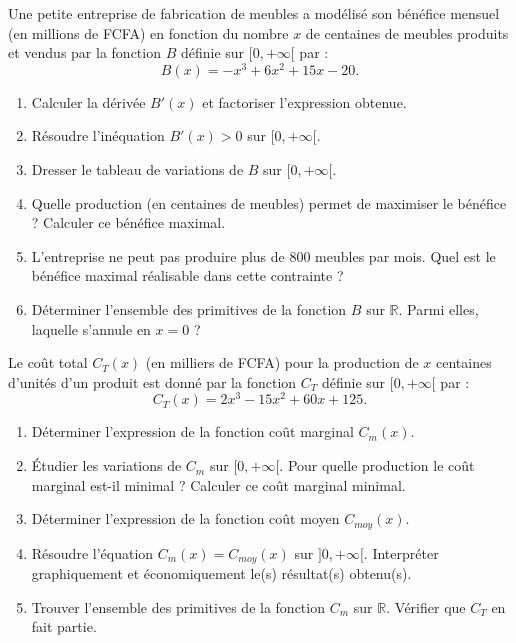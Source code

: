 \documentclass[11pt]{article}
\begin{document}
\begin{exercice}
Une petite entreprise de fabrication de meubles a modélisé son bénéfice mensuel (en millions de FCFA) en fonction du nombre $x$ de centaines de meubles produits et vendus par la fonction $B$ définie sur $[0, +\infty[$ par :
\[ B(x) = -x^3 + 6x^2 + 15x - 20. \]
\begin{enumerate}
    \item Calculer la dérivée $B'(x)$ et factoriser l'expression obtenue.
    \item Résoudre l'inéquation $B'(x) > 0$ sur $[0, +\infty[$.
    \item Dresser le tableau de variations de $B$ sur $[0, +\infty[$.
    \item Quelle production (en centaines de meubles) permet de maximiser le bénéfice ? Calculer ce bénéfice maximal.
    \item L'entreprise ne peut pas produire plus de 800 meubles par mois. Quel est le bénéfice maximal réalisable dans cette contrainte ?
    \item Déterminer l'ensemble des primitives de la fonction $B$ sur $\mathbb{R}$. Parmi elles, laquelle s'annule en $x=0$ ?
\end{enumerate}
\end{exercice}

\begin{exercice}
Le coût total $C_T(x)$ (en milliers de FCFA) pour la production de $x$ centaines d'unités d'un produit est donné par la fonction $C_T$ définie sur $[0, +\infty[$ par :
\[ C_T(x) = 2x^3 - 15x^2 + 60x + 125. \]
\begin{enumerate}
    \item Déterminer l'expression de la fonction coût marginal $C_m(x)$.
    \item Étudier les variations de $C_m$ sur $[0, +\infty[$. Pour quelle production le coût marginal est-il minimal ? Calculer ce coût marginal minimal.
    \item Déterminer l'expression de la fonction coût moyen $C_{moy}(x)$.
    \item Résoudre l'équation $C_m(x) = C_{moy}(x)$ sur $]0, +\infty[$. Interpréter graphiquement et économiquement le(s) résultat(s) obtenu(s).
    \item Trouver l'ensemble des primitives de la fonction $C_m$ sur $\mathbb{R}$. Vérifier que $C_T$ en fait partie.
\end{enumerate}
\end{exercice}
\end{document}
